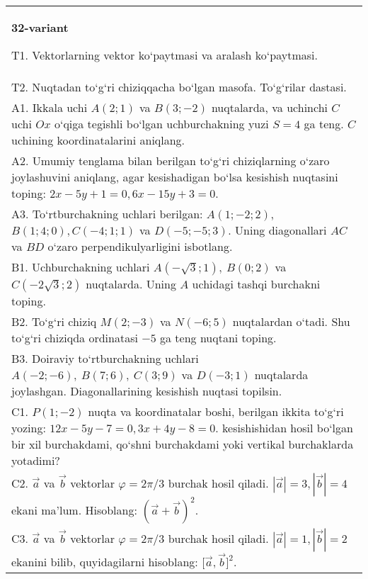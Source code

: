 \documentclass{article}
\begin{document}
\begin{tabular}{m{17cm}}
\textbf{32-variant}

T1. 
Vektorlarning vektor ko‘paytmasi va aralash ko‘paytmasi.
 \\
T2. 
Nuqtadan to‘g‘ri chiziqqacha bo‘lgan masofa. To‘g‘rilar dastasi.
 \\
A1. 
Ikkala uchi $A (2;1) $ va $B (3;-2) $ nuqtalarda, va
uchinchi $C$ uchi $Ox$ o‘qiga tegishli bo‘lgan uchburchakning
yuzi $S=4$ ga teng. $C$ uchining koordinatalarini aniqlang.
 \\
A2. 
Umumiy tenglama bilan berilgan to‘g‘ri chiziqlarning
o‘zaro joylashuvini aniqlang, agar kesishadigan bo‘lsa kesishish nuqtasini
toping: $2x-5y+1=0, 6x-15y+3=0$.
 \\
A3. 
To‘rtburchakning uchlari berilgan:
$A (1; - 2;2) $, $B (1;4;0),C (- 4;1;1) $ va $D (- 5; -5;3) $. Uning diagonallari $AC$ va $BD$ o‘zaro
perpendikulyarligini isbotlang.
 \\
B1. 
Uchburchakning uchlari
\(A\left(-\sqrt{3};1 \right),\ B (0;2) \) va
\(C\left(-2\sqrt{3};2 \right) \) nuqtalarda. Uning $A$
uchidagi tashqi burchakni toping.
 \\
B2. 
To‘g‘ri chiziq \(M (2;-3) \) va \(N (-6;5) \) nuqtalardan o‘tadi.
Shu to‘g‘ri chiziqda ordinatasi $-5$ ga teng nuqtani toping.
 \\
B3. 
Doiraviy to‘rtburchakning uchlari
\(A (-2;-6),\ B (7;6),\ C (3;9) \) va \(D (-3;1) \) nuqtalarda
joylashgan. Diagonallarining kesishish nuqtasi topilsin.
 \\
C1. 
\(P (1;-2) \) nuqta va koordinatalar boshi, berilgan ikkita
to‘g‘ri yozing: $12x-5y-7=0, 3x+4y-8=0$.
kesishishidan hosil bo‘lgan bir xil burchakdami, qo‘shni burchakdami yoki vertikal
burchaklarda yotadimi?
 \\
C2. 
$\vec{a}$ va $\vec{b}$ vektorlar $\varphi = 2\pi/3$ burchak hosil qiladi. $|\vec{a}| = 3,|\vec{b}| = 4$ ekani ma’lum. Hisoblang:
$ (\vec{a} + \vec{b}) ^{2}$.
 \\
C3. 
$\vec{a}$ va $\vec{b}$ vektorlar $\varphi = 2\pi/3$ burchak hosil qiladi. $|\vec{a}| = 1,|\vec{b}| = 2$ ekanini bilib, quyidagilarni hisoblang:
$\lbrack\vec{a},\vec{b}\rbrack^{2}$.
 \\

\end{tabular}
\vspace{1cm}
\end{document}
